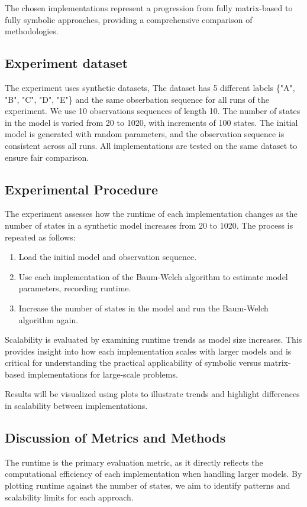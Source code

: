 The chosen implementations represent a progression from fully matrix-based to fully symbolic approaches, providing a comprehensive comparison of methodologies.

\subsection{Experiment dataset}
The experiment uses synthetic datasets, The dataset has 5 different labels \{"A", "B", "C", "D", "E"\} and the same obserbation sequence for all runs of the experiment. 
We use 10 observations sequences of length 10.
The number of states in the model is varied from 20 to 1020, with increments of 100 states.
The initial model is generated with random parameters, and the observation sequence is consistent across all runs.
All implementations are tested on the same dataset to ensure fair comparison.

\subsection{Experimental Procedure}
The experiment assesses how the runtime of each implementation changes as the number of states in a synthetic model increases from 20 to 1020. 
The process is repeated as follows:

\begin{enumerate}
\item Load the initial model and observation sequence.
\item Use each implementation of the Baum-Welch algorithm to estimate model parameters, recording runtime.
\item Increase the number of states in the model and run the Baum-Welch algorithm again.
\end{enumerate}

Scalability is evaluated by examining runtime trends as model size increases.
This provides insight into how each implementation scales with larger models and is critical for understanding the practical applicability of symbolic versus matrix-based implementations for large-scale problems.

Results will be visualized using plots to illustrate trends and highlight differences in scalability between implementations.

\subsection{Discussion of Metrics and Methods}
The runtime is the primary evaluation metric, as it directly reflects the computational efficiency of each implementation when handling larger models. By plotting runtime against the number of states, we aim to identify patterns and scalability limits for each approach.

